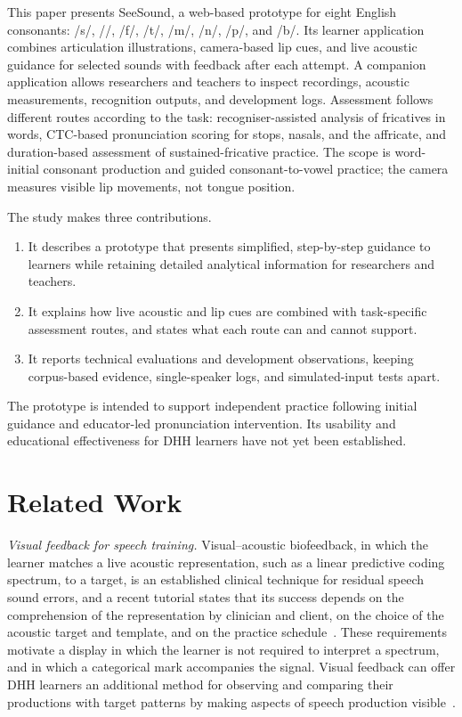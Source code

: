 \documentclass[conference]{IEEEtran}
\newcommand{\ipa}[1]{/#1/}
\begin{document}
This paper presents SeeSound, a web-based prototype for eight English consonants: \ipa{s}, \ipa{\textesh}, \ipa{f}, \ipa{t\textesh}, \ipa{m}, \ipa{n}, \ipa{p}, and \ipa{b}. Its learner application combines articulation illustrations, camera-based lip cues, and live acoustic guidance for selected sounds with feedback after each attempt. A companion application allows researchers and teachers to inspect recordings, acoustic measurements, recognition outputs, and development logs. Assessment follows different routes according to the task: recogniser-assisted analysis of fricatives in words, CTC-based pronunciation scoring for stops, nasals, and the affricate, and duration-based assessment of sustained-fricative practice. The scope is word-initial consonant production and guided consonant-to-vowel practice; the camera measures visible lip movements, not tongue position.

The study makes three contributions.
\begin{enumerate}
\item It describes a prototype that presents simplified, step-by-step guidance to learners while retaining detailed analytical information for researchers and teachers.
\item It explains how live acoustic and lip cues are combined with task-specific assessment routes, and states what each route can and cannot support.
\item It reports technical evaluations and development observations, keeping corpus-based evidence, single-speaker logs, and simulated-input tests apart.
\end{enumerate}
The prototype is intended to support independent practice following initial guidance and educator-led pronunciation intervention. Its usability and educational effectiveness for DHH learners have not yet been established.

\section{Related Work}
\textit{Visual feedback for speech training.} Visual--acoustic biofeedback, in which the learner matches a live acoustic representation, such as a linear predictive coding spectrum, to a target, is an established clinical technique for residual speech sound errors, and a recent tutorial states that its success depends on the comprehension of the representation by clinician and client, on the choice of the acoustic target and template, and on the practice schedule~\cite{hitchcock2023}. These requirements motivate a display in which the learner is not required to interpret a spectrum, and in which a categorical mark accompanies the signal. Visual feedback can offer DHH learners an additional method for observing and comparing their productions with target patterns by making aspects of speech production visible~\cite{hitchcock2023}.
\end{document}
